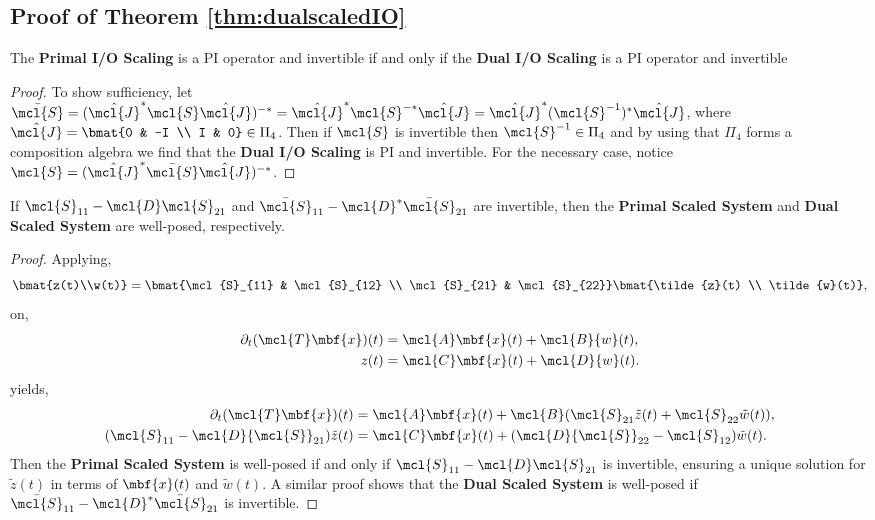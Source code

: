 \subsection{Proof of Theorem \ref{thm:dualscaledIO}}\label{proof:theorem2}

\begin{sublemma}\label{lem:scalingisPI}
	The \textbf{Primal I/O Scaling} is a PI operator and invertible if and only if the \textbf{Dual I/O Scaling} is a PI operator and invertible
\end{sublemma}
\begin{proof}
	To show sufficiency, let $\bar{\mcl{S}} = (\hat{\mcl{J}}^*\mcl{S}\hat{\mcl{J}})^{-*} = \hat{\mcl{J}}^*\mcl{S}^{-*}\hat{\mcl{J}} = \hat{\mcl{J}}^*(\mcl{S}^{-1})^{*}\hat{\mcl{J}}$, where $\hat{\mcl{J}} = \bmat{0 & -I \\ I & 0} \in \Pi_4$. Then if $\mcl{S}$ is invertible then $\mcl{S}^{-1} \in \Pi_4$ and by using that $\Pi_4$ forms a composition algebra we find that the \textbf{Dual I/O Scaling} is PI and invertible. For the necessary case, notice $\mcl{S} = (\hat{\mcl{J}}^*\bar{\mcl{S}}\hat{\mcl{J}})^{-*}$.
\end{proof}
\begin{sublemma}
	If $\mcl{S}_{11} - \mcl{D}\mcl{S}_{21}$ and $\bar{\mcl{S}}_{11} - \mcl{D}^*\bar{\mcl{S}}_{21}$ are invertible, then the \textbf{Primal Scaled System} and \textbf{Dual Scaled System} are well-posed, respectively.
\end{sublemma}
\begin{proof}
	Applying,
	\begin{equation*}
		\bmat{z(t)\\w(t)} = \bmat{\mcl{S}_{11} & \mcl{S}_{12} \\ \mcl{S}_{21} & \mcl{S}_{22}}\bmat{\tilde{z}(t) \\ \tilde{w}(t)},
	\end{equation*}
	on,
	\[
	\begin{aligned}
			\partial_t(\mcl{T}\mbf{x})(t)                         & = \mcl{A}\mbf{x}(t) + \mcl{B}{w}(t), \\
			{z}(t) & = \mcl{C} \mbf{x}(t) + \mcl{D}{w}(t).
		\end{aligned}
	\]
	 yields,
	\[
		\begin{aligned}
			\partial_t(\mcl{T}\mbf{x})(t)                         & = \mcl{A}\mbf{x}(t) + \mcl{B}({\mcl{S}}_{21}\tilde{z}(t) + {\mcl{S}}_{22}\tilde{w}(t)), \\
			({\mcl{S}}_{11} - \mcl{D}{\mcl{S}}_{21}) \tilde{z}(t) & = \mcl{C} \mbf{x}(t) + (\mcl{D}{\mcl{S}}_{22} - {\mcl{S}}_{12}) \tilde{w}(t).
		\end{aligned}
	\]
	Then the \textbf{Primal Scaled System} is well-posed if and only if \( \mcl{S}_{11} - \mcl{D}\mcl{S}_{21} \) is invertible, ensuring a unique solution for \( \tilde{z}(t) \) in terms of \( \mbf{x}(t) \) and \( \tilde{w}(t) \). A similar proof shows that the \textbf{Dual Scaled System} is well-posed if $\bar{\mcl{S}}_{11} - \mcl{D}^*\bar{\mcl{S}}_{21}$ is invertible.
\end{proof}
